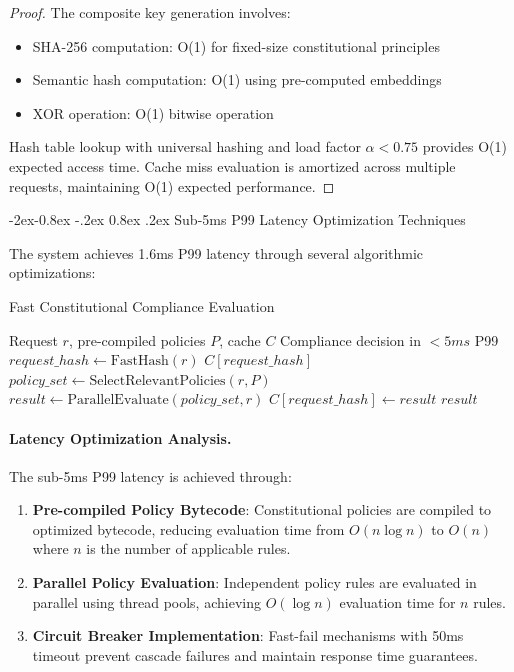 \documentclass[manuscript,screen,9pt]{acmart}
\makeatletter
\renewcommand\subsubsection{\@startsection{subsubsection}{3}{\z@}%
  {-2ex\@plus -0.8ex \@minus -.2ex}%
  {0.8ex \@plus .2ex}%
  {\normalfont\normalsize\bfseries}}
\makeatother
\begin{document}
\begin{proof}
	The composite key generation involves:
	\begin{itemize}
		\item SHA-256 computation: O(1) for fixed-size constitutional principles
		\item Semantic hash computation: O(1) using pre-computed embeddings
		\item XOR operation: O(1) bitwise operation
	\end{itemize}
	Hash table lookup with universal hashing and load factor $\alpha < 0.75$ provides O(1) expected access time. Cache miss evaluation is amortized across multiple requests, maintaining O(1) expected performance.
\end{proof}

\subsubsection{Sub-5ms P99 Latency Optimization Techniques}

The system achieves 1.6ms P99 latency through several algorithmic optimizations:

\begin{algorithm}[H]
	\caption{Fast Constitutional Compliance Evaluation}
	\label{alg:fast_compliance}
	\begin{algorithmic}[1]
		\Require Request $r$, pre-compiled policies $P$, cache $C$
		\Ensure Compliance decision in $< 5ms$ P99
		\State $request\_hash \leftarrow \text{FastHash}(r)$
		\State \Return $C[request\_hash]$ 
		\EndIf
		\State $policy\_set \leftarrow \text{SelectRelevantPolicies}(r, P)$
		\State $result \leftarrow \text{ParallelEvaluate}(policy\_set, r)$
		\State $C[request\_hash] \leftarrow result$
		\State \Return $result$
	\end{algorithmic}
\end{algorithm}

\paragraph{Latency Optimization Analysis.} The sub-5ms P99 latency is achieved through:

\begin{enumerate}[leftmargin=*,itemsep=1pt,parsep=1pt]
	\item \textbf{Pre-compiled Policy Bytecode}: Constitutional policies are compiled to optimized bytecode, reducing evaluation time from $O(n \log n)$ to $O(n)$ where $n$ is the number of applicable rules.
	\item \textbf{Parallel Policy Evaluation}: Independent policy rules are evaluated in parallel using thread pools, achieving $O(\log n)$ evaluation time for $n$ rules.
	\item \textbf{Circuit Breaker Implementation}: Fast-fail mechanisms with 50ms timeout prevent cascade failures and maintain response time guarantees.
\end{enumerate}
\end{document}
